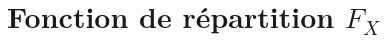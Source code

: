 \documentclass[handout]{BeamerTemplate}
\begin{document}
%
%
%
%
%
%
%
%
%

\section{Fonction de répartition $F_X$}
\end{document}
